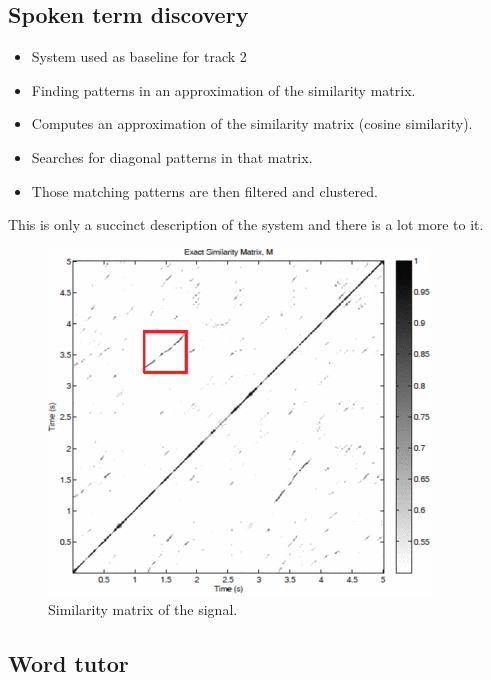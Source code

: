 \documentclass[final]{beamer}
\begin{document}
\begin{frame}[t]
\begin{multicols}{3}

\subsection{Spoken term discovery}

\begin{itemize}
\item System used as baseline for track 2\cite{versteeghetal2015}
\item Finding patterns in an approximation of the similarity matrix.
\item Computes an approximation of the similarity matrix (cosine similarity).
\item Searches for diagonal patterns in that matrix.
\item Those matching patterns are then filtered and clustered.
\end{itemize}

This is only a succinct description of the system and there is a lot more to it.

\begin{figure}[ht!]
  \begin{center}
    \includegraphics[width=0.85\columnwidth]{similarity_matrix}
    \caption{\label{fig:system}Similarity matrix of the signal.}
  \end{center}
\end{figure}

\subsection{Word tutor}


\end{multicols}
\end{frame}
\end{document}
